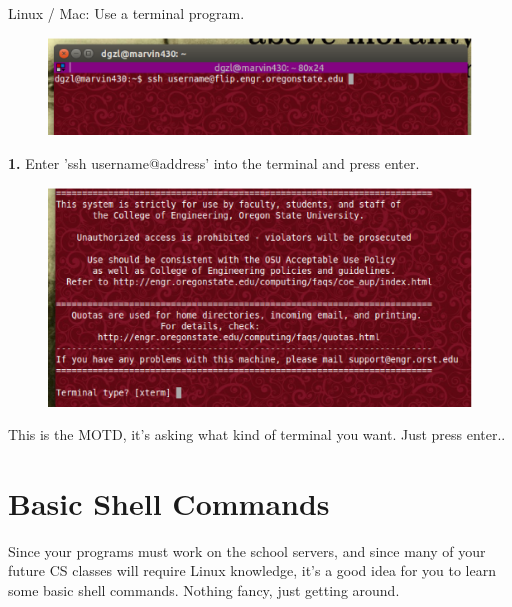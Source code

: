 \documentclass[letterpaper,10pt,titlepage,fleqn]{article}
\begin{document}
Linux / Mac: Use a terminal program.

\begin{figure}[ht!]
  \includegraphics[scale=0.5]{images/ssh_terminal.eps}
\end{figure}    

\textbf{1.} Enter 'ssh username@address' into the terminal and press enter.


\begin{figure}[ht!]
  \includegraphics[scale=0.5]{images/ssh_terminal2.eps}
\end{figure}    

This is the MOTD, it's asking what kind of terminal you want. Just press enter..


\section{Basic Shell Commands}

Since your programs must work on the school servers, and since many of your future
CS classes will require Linux knowledge, it's a good idea for you to learn some
basic shell commands. Nothing fancy, just getting around.
\end{document}
